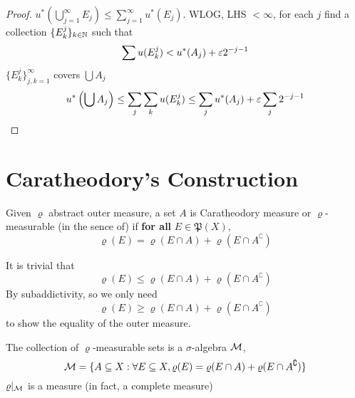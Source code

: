 \begin{proof}
  $u^*(\bigcup_{j=1}^\infty E_j) \le \sum_{j=1}^\infty u^*(E_j)$.
  WLOG, LHS $< \infty$, for each $j$ find a collection $\{E_k^j\}_{k \in \mathbb N}$ such that
  \[\sum u(E_k^j) < u^*(A_j) + \varepsilon 2^{-j-1}\]
  $\{E_k^j\}_{j, k=1}^\infty$ covers $\bigcup A_j$
  \[u^*\left(\bigcup A_j\right)\le \sum_j\sum_k u(E_k^j) \le \sum_j u^*(A_j) + \varepsilon \sum_j {2^{-j-1}}\]
\end{proof}

\section{Caratheodory's Construction}

\begin{definition}
  Given $\varrho$ abstract outer measure,
  a set $A$ is Caratheodory measure or $\varrho$-measurable (in the sence of) 
  if \textbf{for all} $E \in \mathfrak{P}(X)$, 
  \[\varrho(E) = \varrho(E \cap A) + \varrho(E\cap A^\complement)\]
\end{definition}

\begin{remark}
  It is trivial that 
  \[\varrho(E) \le \varrho(E \cap A) + \varrho(E \cap A^\complement)\] 
  By subaddictivity, so we only need 
  \[\varrho(E) \ge \varrho(E \cap A) + \varrho(E \cap A^\complement)\] 
  to show the equality of the outer measure.
\end{remark}

\begin{theorem}
  The collection of $\varrho$-measurable sets is a $\sigma$-algebra $\mathcal M$,
  \[\mathcal M = \{A \subseteq X : \forall E \subseteq X, \varrho(E) = \varrho(E\cap A) + \varrho(E \cap A^\complement)\}\]
  $\varrho|_\mathcal M$
  is a measure (in fact, a complete measure)
\end{theorem}

